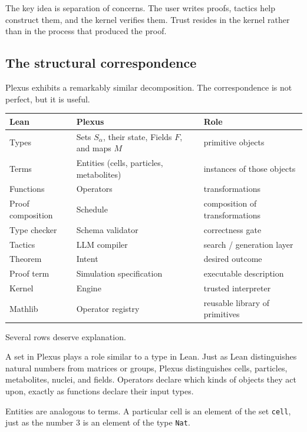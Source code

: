 \documentclass[11pt]{article}
\begin{document}
The key idea is separation of concerns. The user writes proofs, tactics help
construct them, and the kernel verifies them. Trust resides in the kernel rather
than in the process that produced the proof.

\subsection{The structural correspondence}

Plexus exhibits a remarkably similar decomposition. The correspondence is not
perfect, but it is useful.

\begin{center}
\renewcommand{\arraystretch}{1.2}
\footnotesize
\begin{tabular}{@{}lll@{}}
\toprule
\textbf{Lean} & \textbf{Plexus} & \textbf{Role} \\
\midrule
Types & Sets $S_\alpha$, their state, Fields $F$, and maps $M$ & primitive objects \\
Terms & Entities (cells, particles, metabolites) & instances of those objects \\
Functions & Operators & transformations \\
Proof composition & Schedule & composition of transformations \\
Type checker & Schema validator & correctness gate \\
Tactics & LLM compiler & search / generation layer \\
Theorem & Intent & desired outcome \\
Proof term & Simulation specification & executable description \\
Kernel & Engine & trusted interpreter \\
Mathlib & Operator registry & reusable library of primitives \\
\bottomrule
\end{tabular}
\end{center}

Several rows deserve explanation.

A set in Plexus plays a role similar to a type in Lean. Just as Lean
distinguishes natural numbers from matrices or groups, Plexus distinguishes cells,
particles, metabolites, nuclei, and fields. Operators declare which kinds of
objects they act upon, exactly as functions declare their input types.

Entities are analogous to terms. A particular cell is an element of the set
\texttt{cell}, just as the number $3$ is an element of the type \texttt{Nat}.
\end{document}
